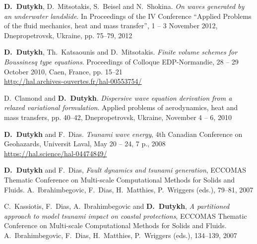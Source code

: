 \begin{etaremune}
  \item \textbf{D.~Dutykh}, D.~Mitsotakis, S.~Beisel and N.~Shokina. \textit{On waves generated by an underwater landslide}. In Proceedings of the IV Conference ``Applied Problems of the fluid mechanics, heat and mass transfer'', 1 -- 3 November 2012, Dnepropetrovsk, Ukraine, pp. 75--79, 2012 %
  

  
  \item \textbf{D.~Dutykh}, Th.~Katsaounis and D.~Mitsotakis. \textit{Finite volume schemes for Boussinesq type equations}. Proceedings of Colloque EDP-Normandie, 28 -- 29 October 2010, Caen, France, pp. 15--21 \\ %
  \url{http://hal.archives-ouvertes.fr/hal-00553754/}

  \item D.~Clamond and \textbf{D.~Dutykh}. \textit{Dispersive wave equation derivation from a relaxed variational formulation}. Applied problems of aerodynamics, heat and mass transfers, pp. 40--42, Dnepropetrovsk, Ukraine, November 4 -- 6, 2010 %
  


  \item \textbf{D.~Dutykh} and F.~Dias. \textit{Tsunami wave energy}, 4th Canadian Conference on Geohazards, Universit Laval, May 20 -- 24, 7 p., 2008 \\ %
  \url{https://hal.science/hal-04474849/}
  


  \item \textbf{D.~Dutykh} and F.~Dias, \textit{Fault dynamics and tsunami generation}, ECCOMAS Thematic Conference on Multi-scale Computational Methods for Solids and Fluids. A.~Ibrahimbegovic, F.~Dias, H.~Matthies, P.~Wriggers (eds.), 79--81, 2007 %

  \item C.~Kassiotis, F.~Dias, A.~Ibrahimbegovic and \textbf{D.~Dutykh}, \textit{A partitioned approach to model tsunami impact on coastal protections}, ECCOMAS Thematic Conference on Multi-scale Computational Methods for Solids and Fluids. A.~Ibrahimbegovic, F.~Dias, H.~Matthies, P.~Wriggers (eds.), 134--139, 2007 %
  
\end{etaremune}

